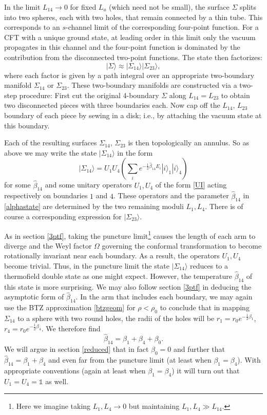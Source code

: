 \documentclass[12pt]{article}
\newcommand{\be}{\begin{equation}}
\newcommand{\ee}{\end{equation}}
\numberwithin{equation}{section}
\begin{document}
In the limit $L_{14} \to 0$ for fixed $L_a$ (which need not be small), the surface $\Sigma$ splits into two spheres, each with two holes, that remain connected by a thin tube. This corresponds to an $s$-channel limit of the corresponding four-point function. For a CFT with a unique ground state, at leading order in this limit only the vacuum propagates in this channel and the four-point function is dominated by the contribution from the disconnected two-point functions.  The state then factorizes:
%
\be
\label{f1234}
|\Sigma \rangle \approx  |\Sigma_{14}\rangle|\Sigma_{23}\rangle,
\ee
where each factor is given by a path integral over an appropriate two-boundary manifold $\Sigma_{14}$ or $\Sigma_{23}$.  These two-boundary manifolds are constructed via a two-step procedure:  First cut the original 4-boundary $\Sigma$ along $L_{14} = L_{23}$ to obtain two disconnected pieces with three boundaries each.  Now cap off the $L_{14}$, $L_{23}$ boundary of each piece by sewing in a disk; i.e., by attaching the vacuum state at this boundary.

Each of the resulting surfaces $\Sigma_{14}$, $\Sigma_{23}$ is then topologically an annulus.  So as above we may write the state $|\Sigma_{14}\rangle$ in the form
\be
\label{alphastate}
|\Sigma_{14}\rangle =  U_1 U_4 \left( \sum_i e^{-\frac{1}{2}\hat \beta_{14} E_i} |i \rangle_1 |i \rangle_4 \right)
\ee
for some $\hat \beta_{14}$ and some unitary operators $U_1, U_4$ of the form \eqref{UI} acting respectively on boundaries $1$ and $4$.  These operators and the parameter $\hat \beta_{14}$ in \eqref{alphastate} are determined by the two remaining moduli $L_1, L_4$.  There is of course a corresponding expression for $|\Sigma_{23}\rangle$.

As in section \ref{3ptf}, taking the puncture limit\footnote{Here we imagine taking $L_1,L_4 \rightarrow 0$ but maintaining $L_1,L_4 \gg L_{14}$.} causes the length of each arm to diverge and the Weyl factor $\Omega$ governing the conformal transformation to become rotationally invariant near each boundary.  As a result, the operators $U_1, U_4$ become trivial.  Thus, in the puncture limit the state $|\Sigma_{14} \rangle$ reduces to a thermofield double state as one might expect.
However, the temperature $\hat \beta_{14}$ of this state is more surprising. We may also follow section \ref{3ptf} in deducing the asymptotic form of $\hat \beta_{14}$.  In the arm that includes each boundary,  we may again use the BTZ approximation \eqref{btzgeom} for $\rho < \rho_0$ to conclude that in mapping $\Sigma_{14}$ to a sphere with two round holes, the radii of the holes will be $r_{1} = r_0 e^{-\frac{1}{2}\beta_{1}}$, $r_{4} = r_0 e^{-\frac{1}{2}\beta_{4}}$.  We therefore find
\be
\label{btzbeta}
\hat \beta_{14} = \beta_1 + \beta_4 + \beta_0.
\ee
We will argue in section \ref{reduced} that in fact $\beta_0 =0$ and further that $\hat \beta_{14} = \beta_1 + \beta_4$ and even far from the puncture limit (at least when $\beta_1 = \beta_4$).  With appropriate conventions (again at least when $\beta_1 = \beta_4$) it will turn out that $U_1 = U_4 = \mathds{1}$ as well.
\end{document}
